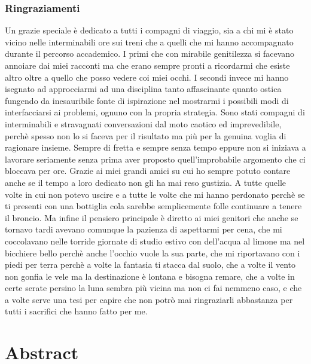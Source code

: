 \documentclass[12pt,a4paper]{book}
\begin{document}
	\tableofcontents  %
	
	\subsection*{Ringraziamenti}
	Un grazie speciale è dedicato a tutti i compagni di viaggio, sia a chi mi è stato vicino nelle interminabili ore sui treni che a quelli che mi hanno accompagnato durante il percorso accademico. I primi che con mirabile genitilezza si facevano annoiare dai miei racconti ma che erano sempre pronti a ricordarmi che esiste altro oltre a quello che posso vedere coi miei occhi. I secondi invece mi hanno isegnato ad approcciarmi ad una disciplina tanto affascinante quanto ostica fungendo da inesauribile fonte di ispirazione nel mostrarmi i possibili modi di interfacciarsi ai problemi, ognuno con la propria strategia. Sono stati compagni di interminabili e stravagnati conversazioni dal moto caotico ed imprevedibile, perchè spesso non lo si faceva per il risultato ma più per la genuina voglia di ragionare insieme. Sempre di fretta e sempre senza tempo eppure non si iniziava a lavorare seriamente senza prima aver proposto quell'improbabile argomento che ci bloccava per ore. Grazie ai miei grandi amici su cui ho sempre potuto contare anche se il tempo a loro dedicato non gli ha mai reso gustizia. A tutte quelle volte in cui non potevo uscire e a tutte le volte che mi hanno perdonato perchè se ti presenti con una bottiglia cola sarebbe semplicemente folle continuare a tenere il broncio. Ma infine il pensiero principale è diretto ai miei genitori che anche se tornavo tardi avevano comunque la pazienza di aspettarmi per cena, che mi coccolavano nelle torride giornate di studio estivo con dell'acqua al limone ma nel bicchiere bello perchè anche l'occhio vuole la sua parte, che mi riportavano con i piedi per terra perchè a volte la fantasia ti stacca dal suolo, che a volte il vento non gonfia le vele ma la destinazione è lontana e bisogna remare, che a volte in certe serate persino la luna sembra più vicina ma non ci fai nemmeno caso, e che a volte serve una tesi per capire che non potrò mai ringraziarli abbastanza per tutti i sacrifici che hanno fatto per me.
	
	\chapter{Abstract}
	
\end{document}
